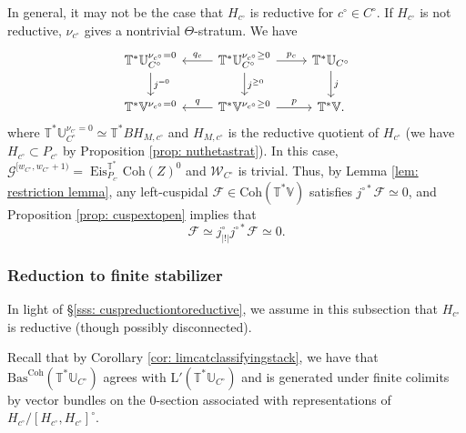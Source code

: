 \documentclass{amsart}
\theoremstyle{definition}
\theoremstyle{remark}
\numberwithin{equation}{section}
\newcommand{\U}{\mathbb{U}}
\newcommand{\mc}{\mathcal}
\DeclareMathOperator{\Eis}{\mathrm{Eis}}
\newcommand{\Coh}{\mathrm{Coh}}
\newcommand{\V}{\mathbb{V}}
\newcommand{\T}{\mathbb{T}}
\newcommand{\Bas}{\mathrm{Bas}}
\newcommand{\ush}{\lvert ! \rvert}
\newcommand{\mrL}{\mathrm{L}}
\begin{document}
In general, it may not be the case that $H_{c^{\circ}}$ is reductive for $c^{\circ} \in C^{\circ}$. If $H_{c^\circ}$ is not reductive, $\nu_{c^{\circ}}$ gives a nontrivial $\Theta$-stratum. We have 
\begin{equation*}
    \begin{tikzcd}
\T^{\ast}\U_{C^{\circ}}^{\nu_{c^{\circ}} = 0} \arrow[d, "j^{=0}"] & \T^{\ast}\U_{C^{\circ}}^{\nu_{c^{\circ}} \geq 0} \arrow[r, "p_c"] \arrow[d, "j^{\geq 0}"] \arrow[l, swap, "q_c"]&  \T^{\ast}\U_{C^{\circ}} \arrow[d, "j"] \\
 \T^{\ast}\V^{\nu_{c^\circ} = 0} & \T^{\ast}\V^{\nu_{c^\circ} \geq 0} \arrow[r, "p"] \arrow[l, swap, "q"] & \T^{\ast}\V .
    \end{tikzcd}
\end{equation*}
where $\T^{\ast}\U_{C^{\circ}}^{\nu_{c^{\circ}} = 0} \simeq \T^{\ast}BH_{M, c^{\circ}}$ and $H_{M, c^{\circ}}$ is the reductive quotient of $H_{c^{\circ}}$ (we have $H_{c^{\circ}} \subset P_{c^{\circ}}$ by Proposition \ref{prop: nuthetastrat}). In this case, $\mc{G}^{[w_{C^{\circ}}, w_{C^{\circ}}+1)} = \Eis^{\T^*}_{P_{c^{\circ}}}\Coh(Z)^0$ and $\mathcal{W}_{C^{\circ}}$ is trivial. Thus, by Lemma \ref{lem: restriction lemma}, any left-cuspidal $\mc{F} \in \Coh(\T^{\ast}\V)$ satisfies 
$j^{\circ\ast} \mc{F} \simeq 0$, and Proposition \ref{prop: cuspextopen} implies that
\[
\mc F\simeq j^\circ_{\ush} j^{\circ*} \mc F \simeq 0. 
\]

\subsubsection{Reduction to finite stabilizer}

In light of \S \ref{sss: cuspreductiontoreductive}, we assume in this subsection that $H_{c^{\circ}}$ is reductive (though possibly disconnected).

Recall that by Corollary \ref{cor: limcatclassifyingstack}, we have that $\Bas^{\Coh}(\T^{\ast}\U_{C^{\circ}})$ agrees with $\mrL'(\T^{\ast}\U_{C^{\circ}})$ and is generated under finite colimits by vector bundles on the $0$-section associated with representations of $H_{c^{\circ}}/[H_{c^{\circ}}, H_{c^{\circ}}]^\circ$.
\end{document}
